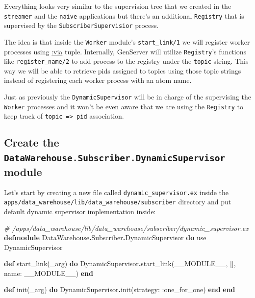 \documentclass[
]{book}
\newenvironment{Shaded}{\begin{snugshade}}{\end{snugshade}}
\newcommand{\CommentTok}[1]{\textcolor[rgb]{0.56,0.35,0.01}{\textit{#1}}}
\newcommand{\ConstantTok}[1]{\textcolor[rgb]{0.00,0.00,0.00}{#1}}
\newcommand{\ImportTok}[1]{#1}
\newcommand{\KeywordTok}[1]{\textcolor[rgb]{0.13,0.29,0.53}{\textbf{#1}}}
\newcommand{\NormalTok}[1]{#1}
\newcommand{\OperatorTok}[1]{\textcolor[rgb]{0.81,0.36,0.00}{\textbf{#1}}}
\newcommand{\VariableTok}[1]{\textcolor[rgb]{0.00,0.00,0.00}{#1}}
\begin{document}
Everything looks very similar to the supervision tree that we created in the \texttt{streamer} and the \texttt{naive} applications but there's an additional \texttt{Registry} that is supervised by the \texttt{SubscriberSupervisior} process.

The idea is that inside the \texttt{Worker} module's \texttt{start\_link/1} we will register worker processes using \href{https://hexdocs.pm/elixir/master/GenServer.html\#module-name-registration}{:via} tuple. Internally, GenServer will utilize \texttt{Registry}'s functions like \texttt{register\_name/2} to add process to the registry under the \texttt{topic} string. This way we will be able to retrieve pids assigned to topics using those topic strings instead of registering each worker process with an atom name.

Just as previously the \texttt{DynamicSupervisor} will be in charge of the supervising the \texttt{Worker} processes and it won't be even aware that we are using the \texttt{Registry} to keep track of \texttt{topic\ =\textgreater{}\ pid} association.

\hypertarget{create-the-datawarehouse.subscriber.dynamicsupervisor-module}{%
\subsection{\texorpdfstring{Create the \texttt{DataWarehouse.Subscriber.DynamicSupervisor} module}{Create the DataWarehouse.Subscriber.DynamicSupervisor module}}\label{create-the-datawarehouse.subscriber.dynamicsupervisor-module}}

Let's start by creating a new file called \texttt{dynamic\_supervisor.ex} inside the \texttt{apps/data\_warehouse/lib/data\_warehouse/subscriber} directory and put default dynamic supervisor implementation inside:

\begin{Shaded}
\begin{Highlighting}[]
\CommentTok{\# /apps/data\_warehouse/lib/data\_warehouse/subscriber/dynamic\_supervisor.ex}
\KeywordTok{defmodule} \ConstantTok{DataWarehouse}\OperatorTok{.}\ConstantTok{Subscriber}\OperatorTok{.}\ConstantTok{DynamicSupervisor} \KeywordTok{do}
  \ImportTok{use} \ConstantTok{DynamicSupervisor}

  \KeywordTok{def}\NormalTok{ start\_link(\_arg) }\KeywordTok{do}
    \ConstantTok{DynamicSupervisor}\OperatorTok{.}\NormalTok{start\_link(}\ConstantTok{\_\_MODULE\_\_}\NormalTok{, [], }\VariableTok{name:} \ConstantTok{\_\_MODULE\_\_}\NormalTok{)}
  \KeywordTok{end}

  \KeywordTok{def}\NormalTok{ init(\_arg) }\KeywordTok{do}
    \ConstantTok{DynamicSupervisor}\OperatorTok{.}\NormalTok{init(}\VariableTok{strategy:} \VariableTok{:one\_for\_one}\NormalTok{)}
  \KeywordTok{end}
\KeywordTok{end}
\end{Highlighting}
\end{Shaded}
\end{document}
